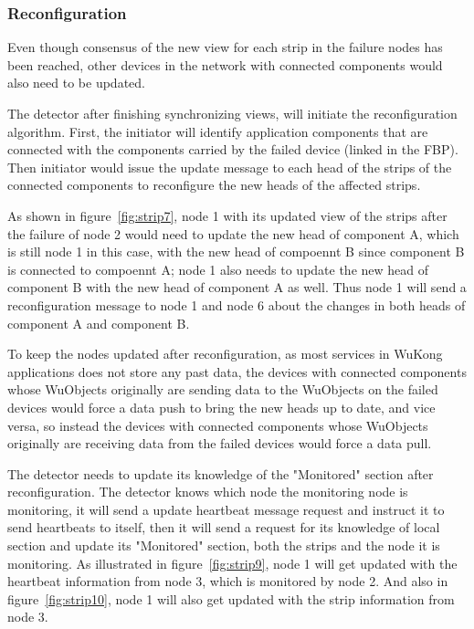 \subsubsection{Reconfiguration}
\label{s:reconfig}


Even though consensus of the new view for each strip in the failure nodes has been
reached, other devices in the network with connected components would also need
to be updated. 

The detector after finishing synchronizing views, will initiate
the reconfiguration algorithm. First, the initiator will identify application components
that are connected with the components carried by the failed device (linked in the
FBP). Then initiator would issue the update message to each head of the strips of the connected components
to reconfigure the new heads of the affected strips.

As shown in figure~\ref{fig:strip7}, node 1 with its updated view of the strips
after the failure of node 2 would need to update the new head of component A,
which is still node 1 in this case, with the new head of compoennt B since
component B is connected to compoennt A; node 1 also needs to update the new
head of component B with the new head of component A as well. Thus node 1 will
send a reconfiguration message to node 1 and node 6 about the changes in both
heads of component A and component B.

To keep the nodes updated after reconfiguration, as most services in WuKong
applications does not store any past data, the devices with connected components whose WuObjects
originally are sending data to the WuObjects on the failed devices would force a data push to
bring the new heads up to date, and vice versa, so instead the devices with
connected components whose WuObjects originally are receiving data from the
failed devices would force a data pull.

The detector needs to update its knowledge of the "Monitored" section after
reconfiguration. The detector knows which node the monitoring node is
monitoring, it will send a update heartbeat message request and instruct it to
send heartbeats to itself, then it will send a request for its knowledge of
local section and update its "Monitored" section, both the strips and the node
it is monitoring. As illustrated in figure~\ref{fig:strip9}, node 1 will get
updated with the heartbeat information from node 3, which is monitored by node
2. And also in figure~\ref{fig:strip10}, node 1 will also get updated with the strip
information from node 3.


